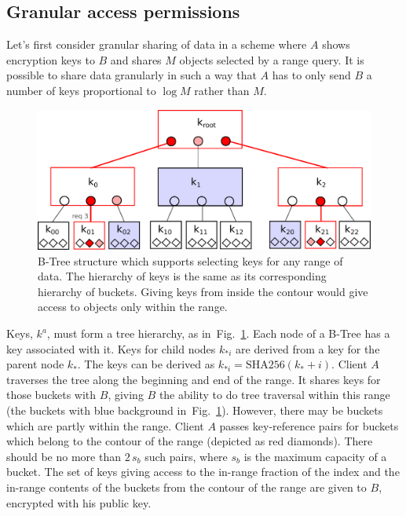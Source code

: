 \documentclass[notitlepage,longbibliography]{revtex4-1}
\newcommand{\figref}[1]{Fig.~\ref{#1}}
\begin{document}
\subsection{Granular access permissions}

Let's first consider granular sharing of data in a scheme where $A$ shows encryption keys to $B$ and shares $M$ objects selected by a range query.
It is possible to share data granularly in such a way that $A$ has to only send $B$ a number of keys proportional to $\log{M}$ rather than $M$.

\begin{figure}
    \begin{center}
        \includegraphics[width=0.7\columnwidth]{keytree.pdf}
    \end{center}
    \caption{
        B-Tree structure which supports selecting keys for any range of data.
        The hierarchy of keys is the same as its corresponding hierarchy of buckets.
        Giving keys from inside the contour would give access to objects only within the range.
    }
    \label{fig:keytree}
\end{figure}

Keys, $k^a$, must form a tree hierarchy, as in~\figref{fig:keytree}.
Each node of a B-Tree has a key associated with it.
Keys for child nodes $k_{*i}$ are derived from a key for the parent node $k_*$.
The keys can be derived as $k_{*i} = \mbox{SHA256}(k_* + i)$.
Client $A$ traverses the tree along the beginning and end of the range.
It shares keys for those buckets with $B$, giving $B$ the ability to do tree traversal within this range (the buckets with blue background in~\figref{fig:keytree}).
However, there may be buckets which are partly within the range.
Client $A$ passes key-reference pairs for buckets which belong to the contour of the range (depicted as red diamonds).
There should be no more than $2\,s_b$ such pairs, where $s_b$ is the maximum capacity of a bucket.
The set of keys giving access to the in-range fraction of the index and the in-range contents of the buckets from the contour of the range are given to $B$, encrypted with his public key.
\end{document}
